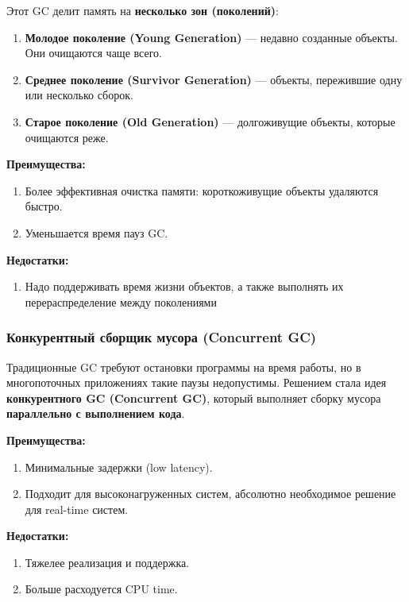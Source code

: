 Этот GC делит память на \textbf{несколько зон (поколений)}:
\begin{enumerate}[label=\arabic*.]
    \item \textbf{Молодое поколение (Young Generation)} — недавно созданные объекты. Они очищаются чаще всего.
    \item \textbf{Среднее поколение (Survivor Generation)} — объекты, пережившие одну или не\-сколько сборок.
    \item \textbf{Старое поколение (Old Generation)} — долгоживущие объекты, которые очищаются реже.
\end{enumerate}

\textbf{Преимущества:}
\begin{enumerate}[label=\arabic*.]
    \item Более эффективная очистка памяти: короткоживущие объекты удаляются быстро.
    \item Уменьшается время пауз GC.
\end{enumerate}

\textbf{Недостатки:}
\begin{enumerate}[label=\arabic*.]
    \item Надо поддерживать время жизни объектов, а также выполнять их перераспределение между поколениями
\end{enumerate}


\subsubsection{Конкурентный сборщик мусора (Concurrent GC)}

Традиционные GC требуют остановки программы на время работы, но в многопоточных приложениях такие паузы недопустимы. Решением стала идея \textbf{конкурентного GC (Concurrent GC)}, который выполняет сборку мусора \textbf{параллельно с выполнением кода}.

\textbf{Преимущества:}
\begin{enumerate}[label=\arabic*.]
    \item Минимальные задержки (low latency).
    \item Подходит для высоконагруженных систем, абсолютно необходимое решение для real-time систем.
\end{enumerate}

\textbf{Недостатки:}
\begin{enumerate}[label=\arabic*.]
    \item Тяжелее реализация и поддержка.
    \item Больше расходуется CPU time.
\end{enumerate}

